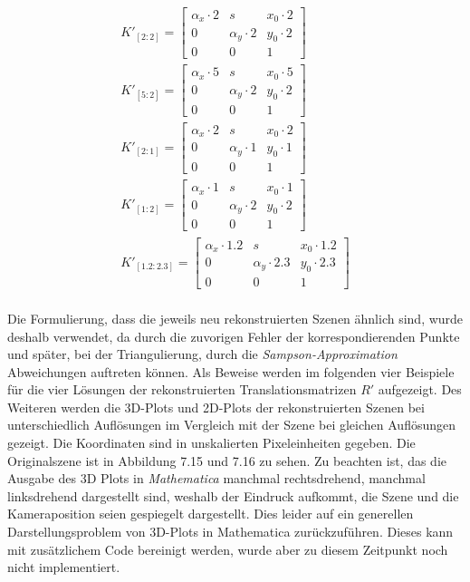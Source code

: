 \begin{gather*}
K'_{[2:2]}=	
\begin{bmatrix}
\alpha_x \cdot 2 &s&x_{0} \cdot 2\\
0&\alpha_y \cdot 2&y_{0} \cdot 2\\
0&0&1
\end{bmatrix}\\
K'_{[5:2]}=	
\begin{bmatrix}
\alpha_x \cdot 5 &s&x_{0} \cdot 5\\
0&\alpha_y \cdot 2&y_{0} \cdot 2\\
0&0&1
\end{bmatrix}\\
K'_{[2:1]}=	
\begin{bmatrix}
\alpha_x \cdot 2 &s&x_{0} \cdot 2\\
0&\alpha_y \cdot 1&y_{0} \cdot 1\\
0&0&1
\end{bmatrix}\\
K'_{[1:2]}=	
\begin{bmatrix}
\alpha_x \cdot 1 &s&x_{0} \cdot 1\\
0&\alpha_y \cdot 2&y_{0} \cdot 2\\
0&0&1
\end{bmatrix}\\
K'_{[1.2:2.3]}=	
\begin{bmatrix}
\alpha_x \cdot 1.2 &s&x_{0} \cdot 1.2\\
0&\alpha_y \cdot 2.3&y_{0} \cdot 2.3\\
0&0&1
\end{bmatrix}\\
\end{gather*}

Die Formulierung, dass die jeweils neu rekonstruierten Szenen ähnlich sind, wurde deshalb verwendet, da durch die zuvorigen Fehler der korrespondierenden Punkte und später, bei der Triangulierung, durch die \textit{Sampson-Approximation} Abweichungen auftreten können. Als Beweise werden im folgenden vier Beispiele für die vier Lösungen der rekonstruierten Translationsmatrizen $R'$ aufgezeigt. Des Weiteren werden die 3D-Plots und 2D-Plots der rekonstruierten Szenen bei unterschiedlich Auflösungen im Vergleich mit der Szene bei gleichen Auflösungen gezeigt. Die Koordinaten sind in unskalierten Pixeleinheiten gegeben. Die Originalszene ist in Abbildung 7.15 und 7.16 zu sehen. Zu beachten ist, das die Ausgabe des 3D Plots in \textit{Mathematica} manchmal rechtsdrehend, manchmal linksdrehend dargestellt sind, weshalb der Eindruck aufkommt, die Szene und die Kameraposition seien gespiegelt dargestellt. Dies leider auf ein generellen Darstellungsproblem von 3D-Plots in Mathematica zurückzuführen. Dieses kann mit zusätzlichem Code bereinigt werden, wurde aber zu diesem Zeitpunkt noch nicht implementiert. 


